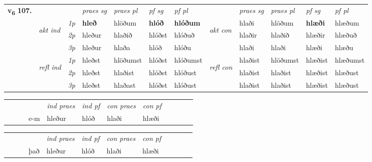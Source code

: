 \begin{tabular}{llllllllllll} \toprule
\multirow{4}{*}{{{\textbf{v{\textsubscript{6}}} \Large{\textbf{107.}}}}}  & &   &  \textit{praes sg}  & \textit{praes pl}  &\textit{ pf sg} & \textit{pf pl} &  &  \textit{praes sg}  & \textit{praes pl}  & \textit{pf sg} & \textit{pf pl } \\*
	\cmidrule{4-7} \cmidrule{9-12}
 & \multirow{3}{*}{\begin{turn}{90}\textit{akt ind}\end{turn}} & {\textit{1p}} & \textbf{hleð} & hlöðum    & \textbf{hlóð} & \textbf{hlóðum} & \multirow{3}{*}{\begin{turn}{90}\textit{akt con}\end{turn}} &hlaði & hlöðum & \textbf{hlæði} & hlæðum\\*
& &  {\textit{2p}} &  hleður  & hlaðið   & hlóðst & hlóðuð & & hlaðir & hlaðið & hlæðir & hlæðuð \\*
& &  {\textit{3p}} & hleður & hlaða   & hlóð & hlóðu & & hlaði & hlaði& hlæði & hlæðu  \\*
\cmidrule{4-7} \cmidrule{9-12}
 &\multirow{3}{*}{\begin{turn}{90}\textit{refl ind}\end{turn}} & {\textit{1p}} & hleðst & hlöðumst    & hlóðst & hlóðumst & \multirow{3}{*}{\begin{turn}{90}\textit{refl con}\end{turn}}  &hlaðist & hlöðumst & hlæðist & hlæðumst\\*
 &&  {\textit{2p}} &  hleðst  & hlaðist   & hlóðst & hlóðust & &hlaðist & hlaðist & hlæðist & hlæðust \\*
& &  {\textit{3p}} & hleðst & hlaðast   & hlóðst & hlóðust & & hlaðist & hlaðist& hlæðist & hlæðust  \\*
\cmidrule{4-7} \cmidrule{9-12}
\end{tabular}


\begin{tabular}{llllllllllll}
 & &  & &  \textit{ind praes} & \textit{ind pf} & \textit{con praes} & \textit{con pf} \\*
&  & & e-m & hleður & hlóð & hlaði & hlæði \\*
\cmidrule{5-9}
\end{tabular}


\begin{tabular}{llllllllllll}
 & &  & &  \textit{ind praes} & \textit{ind pf} & \textit{con praes} & \textit{con pf} \\*
&  & & það & hleður & hlóð & hlaði & hlæði \\*
\cmidrule{5-9}
\end{tabular}


